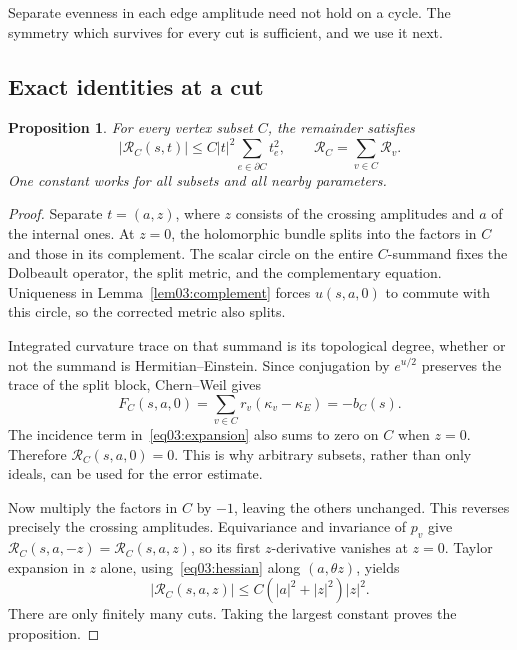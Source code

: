 \documentclass[11pt]{amsart}
\newtheorem{proposition}[theorem]{Proposition}
\theoremstyle{definition}
\theoremstyle{remark}
\newcommand{\cR}{\mathcal R}
\begin{document}
Separate evenness in each edge amplitude need not hold on a cycle.
The symmetry which survives for every cut is sufficient, and we
use it next.

\subsection{Exact identities at a cut}

\begin{proposition}\label{prop03:cut}
For every vertex subset \(C\), the remainder satisfies
\begin{equation}\label{eq03:cut}
 |\cR_C(s,t)|\leq C|t|^2
                  \sum_{e\in\partial C}t_e^2,\qquad
 \cR_C=\sum_{v\in C}\cR_v.
\end{equation}
One constant works for all subsets and all nearby parameters.
\end{proposition}

\begin{proof}
Separate \(t=(a,z)\), where \(z\) consists of the crossing
amplitudes and \(a\) of the internal ones.
At \(z=0\), the holomorphic bundle splits into the factors in
\(C\) and those in its complement. The scalar circle on the
entire \(C\)-summand fixes the Dolbeault operator, the split
metric, and the complementary equation. Uniqueness in
Lemma~\ref{lem03:complement} forces \(u(s,a,0)\) to commute
with this circle, so the corrected metric also splits.

Integrated curvature trace on that summand is its topological
degree, whether or not the summand is Hermitian--Einstein.
Since conjugation by \(e^{u/2}\) preserves the trace of the
split block, Chern--Weil gives
\begin{equation}\label{eq03:cutdegree}
 F_C(s,a,0)=\sum_{v\in C}r_v(\kappa_v-\kappa_E)=-b_C(s).
\end{equation}
The incidence term in~\eqref{eq03:expansion} also sums to zero
on \(C\) when \(z=0\). Therefore \(\cR_C(s,a,0)=0\).
This is why arbitrary subsets, rather than only ideals, can be
used for the error estimate.

Now multiply the factors in \(C\) by \(-1\), leaving the others
unchanged. This reverses precisely the crossing amplitudes.
Equivariance and invariance of \(p_v\) give
\(\cR_C(s,a,-z)=\cR_C(s,a,z)\), so its first \(z\)-derivative
vanishes at \(z=0\). Taylor expansion in \(z\) alone,
using~\eqref{eq03:hessian} along \((a,\theta z)\), yields
\[
 |\cR_C(s,a,z)|
 \leq C(|a|^2+|z|^2)|z|^2.
\]
There are only finitely many cuts. Taking the largest constant
proves the proposition.
\end{proof}
\end{document}
